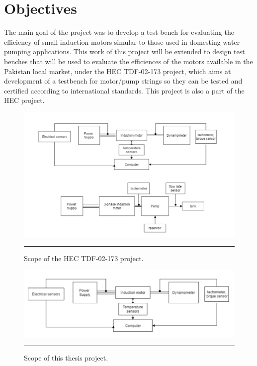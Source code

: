 \section{Objectives}
The main goal of the project was to develop a test bench for evaluating the efficiency of small induction motors simular to those used in domesting water pumping applications. This work of this project will be extended to design test benches that will be used to evaluate the efficiences of the motors available in the Pakistan local market, under the HEC TDF-02-173 project, which aims at development of a testbench for motor/pump strings so they can be tested and certified according to international standards. This project is also a part of the HEC project.
\begin{figure}[htbp]
  \centering
    \includegraphics[width = 5in]{./Figures/MS/fig16.png}
    \rule{35em}{1.2pt}
  \caption{Scope of the HEC TDF-02-173 project.}
  \label{fig:Scope of the HEC TDF-02-173 project.}
\end{figure}
\begin{figure}[htbp]
  \centering
    \includegraphics[width = 5in]{./Figures/MS/fig17.png}
    \rule{35em}{1.2pt}
  \caption{Scope of this thesis project.}
  \label{fig:Scope of this thesis project.}
\end{figure}

